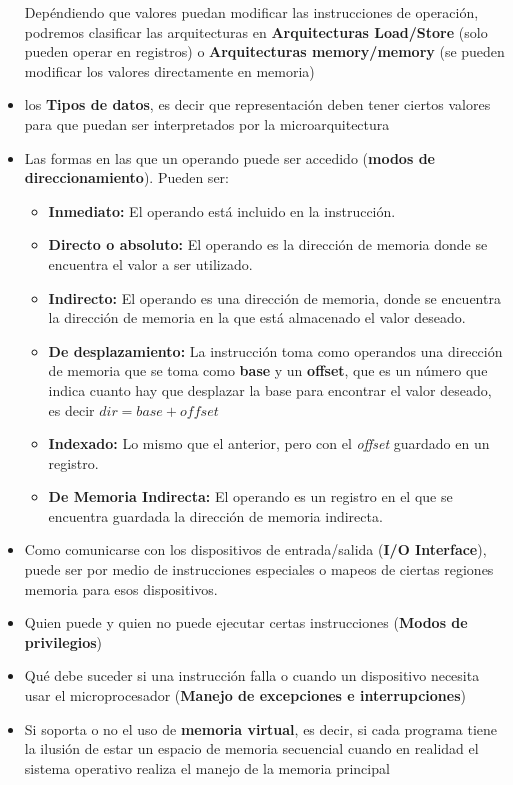 \begin{itemize}
	Depéndiendo que valores puedan modificar las instrucciones de operación, podremos clasificar las arquitecturas en \textbf{Arquitecturas Load/Store} (solo pueden operar en registros) o \textbf{Arquitecturas memory/memory} (se pueden modificar los valores directamente en memoria)
	\item los \textbf{Tipos de datos}, es decir que representación deben tener ciertos valores para que puedan ser interpretados por la microarquitectura
	\item Las formas en las que un operando puede ser accedido (\textbf{modos de direccionamiento}). Pueden ser:
	\begin{itemize}
		\item \textbf{Inmediato:} El operando está incluido en la instrucción.
		\item \textbf{Directo o absoluto:} El operando es la dirección de memoria donde se encuentra el valor a ser utilizado.
		\item \textbf{Indirecto:} El operando es una dirección de memoria, donde se encuentra la dirección de memoria en la que está almacenado el valor deseado.
		\item \textbf{De desplazamiento:} La instrucción toma como operandos una dirección de memoria que se toma como \textbf{base} y un \textbf{offset}, que es un número que indica cuanto hay que desplazar la base para encontrar el valor deseado, es decir $dir = base + offset$
		\item \textbf{Indexado:} Lo mismo que el anterior, pero con el \textit{offset} guardado en un registro.
		\item \textbf{De Memoria Indirecta:} El operando es un registro en el que se encuentra guardada la dirección de memoria indirecta.
	\end{itemize}
	\item Como comunicarse con los dispositivos de entrada/salida (\textbf{I/O Interface}), puede ser por medio de instrucciones especiales o mapeos de ciertas regiones memoria para esos dispositivos.
	\item Quien puede y quien no puede ejecutar certas instrucciones (\textbf{Modos de privilegios})
	\item Qué debe suceder si una instrucción falla o cuando un dispositivo necesita usar el microprocesador (\textbf{Manejo de excepciones e interrupciones})
	\item Si soporta o no el uso de \textbf{memoria virtual}, es decir, si cada programa tiene la ilusión de estar un espacio de memoria secuencial cuando en realidad el sistema operativo realiza el manejo de la memoria principal
\end{itemize}

